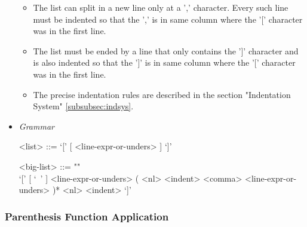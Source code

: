 \documentclass{article}
\begin{document}
\begin{itemize}
\begin{itemize}
  \item
  The list can split in a new line only at a ',' character. Every such line must
  be indented so that the ',' is in same column where the '[' character was in
  the first line.

  \item
  The list must be ended by a line that only contains the ']' character and is 
  also indented so that the ']' is in same column where the '[' character was in
  the first line.

  \item
  The precise indentation rules are described in the section
  "Indentation System" \ref{subsubsec:indsys}.
  \end{itemize}

\item \textit{Grammar}
\begin{grammar}
<list> ::= `[' [ <line-expr-or-unders> ] `]'

<big-list> ::= ""\\
`[' [ `\ ' ] <line-expr-or-unders>
( <nl> <indent> <comma> <line-expr-or-unders> )* <nl> <indent> `]'
\end{grammar}

\end{itemize}

\subsubsection{Parenthesis Function Application}
\label{subsec:parenfuncapp}
\end{document}
